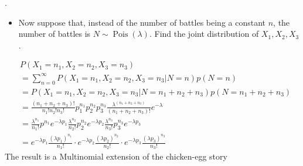 \documentclass[8pt]{beamer}
\newcommand{\Pois}[1]{\operatorname{Pois}(#1)}
\begin{document}
\begin{frame}{.}
    \begingroup
        \begin{itemize}
            \item Now suppose that, instead of the number of battles being a constant $n$, the number of battles is $N \sim \Pois{\lambda}$. Find the joint distribution of $X_1, X_2, X_3$.
        \end{itemize}
    \endgroup

    \[
    \begin{aligned}
        &P(X_1=n_1, X_2=n_2, X_3=n_3) \\
        &= \sum_{n=0}^\infty P(X_1=n_1, X_2=n_2, X_3=n_3 | N=n)p(N=n) \\
        &=P(X_1=n_1, X_2=n_2, X_3=n_3 | N=n_1+n_2+n_3)p(N=n_1+n_2+n_3) \\
        &=\frac{(n_1 + n_2 + n_3)!}{n_1! n_2! n_3!} p_1^{n_1} p_2^{n_2} p_3^{n_3} \frac{\lambda^{(n_1 + n_2 + n_3)}}{(n_1 + n_2 + n_3)!} e^{-\lambda} \\
        &= \frac{\lambda^{n_1}}{n_1!} p^{n_1}e^{-\lambda p_1} \frac{\lambda^{n_2}}{n_2!} p_2^{n_2}e^{-\lambda p_2} \frac{\lambda^{n_3}}{n_3!} p_3^{n_3} e^{-\lambda p_3} \\
        &= e^{-\lambda p_1} \frac{(\lambda p_1)^{n_1}}{n_1!} \cdot e^{-\lambda p_2} \frac{(\lambda p_2)^{n_2}}{n_2!} \cdot e^{-\lambda p_3} \frac{(\lambda p_3)^{n_3}}{n_3!}
    \end{aligned}
    \]
    The result is a Multinomial extension of the chicken-egg story
\end{frame}
\end{document}
